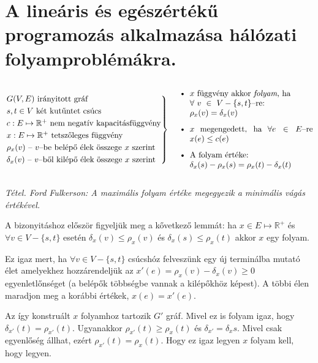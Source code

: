 \newpage
\section{A lineáris és egészértékű programozás alkalmazása hálózati folyamproblémákra.}

\[
\begin{rcases} 
G(V,E) \mbox{ irányitott gráf} \\
s,t \in V \mbox{ két kutűntet csúcs} \\
c : E \mapsto \mathbb{R}^+ \mbox{ nem negatív kapacitásfüggvény}\\
x : E \mapsto \mathbb{R}^+ \mbox{ tetszőleges függvény}\\
\rho_x(v) \mbox{ -- } v\mbox{--be belépő élek összege } x \mbox{ szerint} \\
\delta_x(v) \mbox{ -- } v\mbox{--ből kilépő élek összege } x \mbox{ szerint}
\end{rcases} \parbox[c]{6.2cm}{ 
\begin{itemize}
  \item $x$ függvény akkor \emph{folyam}, ha \\ $\forall~v~\in~V - \{s,t\}$--re: \\ $\rho_x(v)=\delta_x(v)$
  \item $x$ megengedett, ha $\forall e \in E$--re $x(e) \leq c(e)$
  \item A folyam értéke: \\ $\delta_x(s)-\rho_x(s)=\rho_x(t)-\delta_x(t)$
\end{itemize}
 }
\]

\emph{Tétel. Ford Fulkerson: A maximális folyam értéke megegyezik a minimális vágás értékével.}

A bizonyitáshoz először figyeljük meg a kővetkező lemmát: ha $x \in E \mapsto
\mathbb{R}^+$ és $\forall v \in V - \{s,t\}$ esetén $ \delta_x(v) \leq \rho_x(v)$
és $\delta_x(s) \leq \rho_x(t)$ akkor $x$ egy folyam. 

Ez igaz mert, ha $\forall v \in V-\{s,t\}$ csúcshóz felveszünk egy új terminálba
mutató élet amelyekhez hozzárendeljük az $x'(e)=\rho_x(v)-\delta_x(v) \geq 0$
egyenletlőnséget (a belépők többségbe vannak a kilépőkhöz képest). A többi élen
maradjon meg a korábbi értékek, $x(e)=x'(e)$. 

Az így konstruált $x$ folyamhoz tartozik $G'$ gráf.  Mivel ez is folyam igaz,
hogy $\delta_{x'}(t) = \rho_{x'}(t)$. Ugyanakkor $ \rho_{x'}(t) \geq \rho_x(t)$
és $\delta_{x'}=\delta_{x}s$. Mivel csak egyenlőség állhat, ezért
$\rho_{x'}(t)=\rho_{x}(t)$. Hogy ez igaz legyen $x$ folyam kell, hogy legyen.


